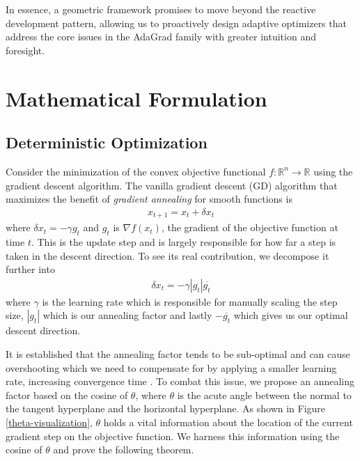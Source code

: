 \documentclass{article}
\begin{document}
\noindent
In essence, a geometric framework promises to move beyond the reactive development pattern, allowing us to proactively design adaptive optimizers that address the core issues in the AdaGrad family with greater intuition and foresight.

\section{Mathematical Formulation}
\subsection{Deterministic Optimization}
Consider the minimization of the convex objective functional $f: \mathbb{R}^n \to \mathbb{R}$ using the gradient descent algorithm.
The vanilla gradient descent (GD) algorithm that maximizes the benefit of \textit{gradient annealing} for smooth functions is
\begin{align}
x_{t+1} = x_t + \delta x_t
\end{align}
where $\delta x_t = -\gamma g_t$ and $g_t$ is $\nabla f(x_t)$, the gradient of the objective function at time $t$. This is the update step and is largely responsible for how far a step is taken in the descent direction. To see its real contribution, we decompose it further into
\begin{align}
\delta x_t = - \gamma |g_t|\overline{g_t}
\end{align}
where $\gamma$ is the learning rate which is responsible for manually scaling the step size, $|g_t|$ which is our annealing factor and lastly $-\overline{g_t}$ which gives us our optimal descent direction.%

It is established that the annealing factor tends to be sub-optimal and can cause overshooting which we need to compensate for by applying a smaller learning rate, increasing convergence time \citep{nar2018step}.
To combat this issue, we propose an annealing factor based on the cosine of $\theta$, where $\theta$ is the acute angle between the normal to the tangent hyperplane and the horizontal hyperplane.
As shown in Figure \ref{theta-visualization}, $\theta$ holds a vital information about the location of the current gradient step on the objective function. We harness this information using the cosine of $\theta$ and prove the following theorem.
\end{document}
